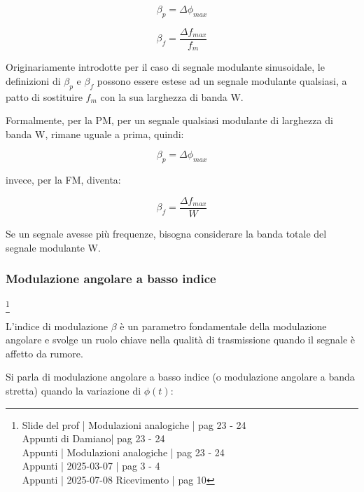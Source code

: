 {
    \Large 
    \begin{equation}
        \beta_p = \Delta \phi_{max}
    \end{equation}
}

{
    \Large 
    \begin{equation}
        \beta_f = \frac{\Delta f_{max}}{f_m}
    \end{equation}
}

Originariamente introdotte per il caso di segnale modulante sinusoidale, 
le definizioni di $\beta_p$ e $\beta_f$ possono essere estese ad un segnale modulante qualsiasi, 
a patto di sostituire $f_m$ con la sua larghezza di banda W. \newline 

Formalmente, per la PM, per un segnale qualsiasi modulante di larghezza di banda W, rimane uguale a prima, quindi: 

{
    \Large 
    \begin{equation}
        \beta_p = \Delta \phi_{max}
    \end{equation}
}

invece, per la FM, diventa: 

{
    \Large 
    \begin{equation}
        \beta_f = \frac{\Delta f_{max}}{W}
    \end{equation}
}

Se un segnale avesse più frequenze, bisogna considerare la banda totale del segnale modulante W. \newline 

\newpage 


\subsubsection{Modulazione angolare a basso indice}
\footnote{Slide del prof | Modulazioni analogiche | pag 23 - 24\\  
Appunti di Damiano| pag 23 - 24\\
Appunti | Modulazioni analogiche | pag 23 - 24\\
Appunti | 2025-03-07 | pag 3 - 4\\
Appunti | 2025-07-08 Ricevimento | pag 10
} 

L'indice di modulazione $\beta$ è un parametro fondamentale della modulazione angolare 
e svolge un ruolo chiave nella qualità di trasmissione quando il segnale è affetto da rumore. \newline 

Si parla di modulazione angolare a basso indice (o modulazione angolare a banda stretta)
quando la variazione di $\phi (t)$: 

